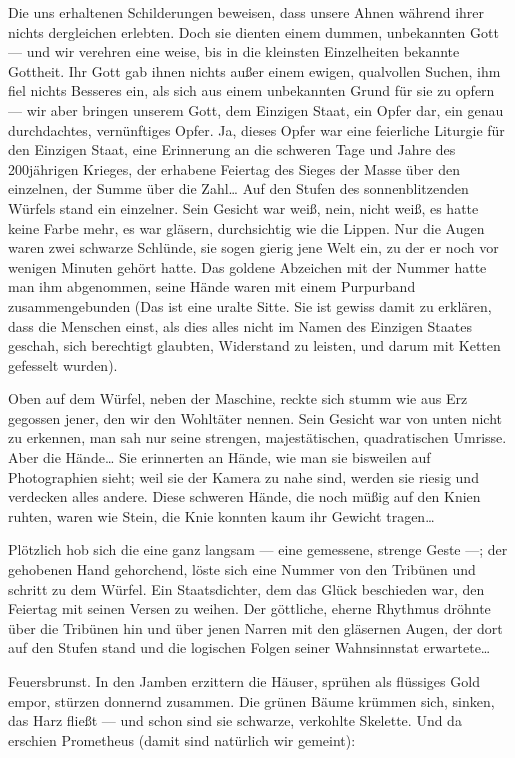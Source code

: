 Die uns erhaltenen Schilderungen beweisen, dass unsere Ahnen
während ihrer  nichts dergleichen erlebten. Doch sie
dienten einem dummen, unbekannten Gott — und wir verehren eine
weise, bis in die kleinsten Einzelheiten bekannte Gottheit. Ihr
Gott gab ihnen nichts außer einem ewigen, qualvollen Suchen, ihm
fiel nichts Besseres ein, als sich aus einem unbekannten Grund für
sie zu opfern — wir aber bringen unserem Gott, dem Einzigen Staat,
ein Opfer dar, ein genau durchdachtes, vernünftiges Opfer. Ja,
dieses Opfer war eine feierliche Liturgie für den Einzigen Staat,
eine Erinnerung an die schweren Tage und Jahre des 200jährigen
Krieges, der erhabene Feiertag des Sieges der Masse über den
einzelnen, der Summe über die Zahl\ldots{} Auf den Stufen des
sonnenblitzenden Würfels stand ein einzelner. Sein Gesicht war
weiß, nein, nicht weiß, es hatte keine Farbe mehr, es war gläsern,
durchsichtig wie die Lippen. Nur die Augen waren zwei schwarze
Schlünde, sie sogen gierig jene Welt ein, zu der er noch vor
wenigen Minuten gehört hatte. Das goldene Abzeichen mit der Nummer
hatte man ihm abgenommen, seine Hände waren mit einem Purpurband
zusammengebunden (Das ist eine uralte Sitte. Sie ist gewiss damit
zu erklären, dass die Menschen einst, als dies alles nicht im Namen
des Einzigen Staates geschah, sich berechtigt glaubten, Widerstand
zu leisten, und darum mit Ketten gefesselt wurden).

Oben auf dem Würfel, neben der Maschine, reckte sich stumm wie aus
Erz gegossen jener, den wir den Wohltäter nennen. Sein Gesicht war
von unten nicht zu erkennen, man sah nur seine strengen,
majestätischen, quadratischen Umrisse. Aber die Hände\ldots{} Sie
erinnerten an Hände, wie man sie bisweilen auf Photographien sieht;
weil sie der Kamera zu nahe sind, werden sie riesig und verdecken
alles andere. Diese schweren Hände, die noch müßig auf den Knien
ruhten, waren wie Stein, die Knie konnten kaum ihr Gewicht
tragen\ldots{}

Plötzlich hob sich die eine ganz langsam — eine
gemessene, strenge Geste —; der gehobenen Hand gehorchend, löste
sich eine Nummer von den Tribünen und schritt zu dem Würfel. Ein
Staatsdichter, dem das Glück beschieden war, den Feiertag mit
seinen Versen zu weihen. Der göttliche, eherne Rhythmus dröhnte
über die Tribünen hin und über jenen Narren mit den gläsernen
Augen, der dort auf den Stufen stand und die logischen Folgen
seiner Wahnsinnstat erwartete\ldots{}

Feuersbrunst. In den Jamben
erzittern die Häuser, sprühen als flüssiges Gold empor, stürzen
donnernd zusammen. Die grünen Bäume krümmen sich, sinken, das Harz
fließt — und schon sind sie schwarze, verkohlte Skelette. Und da
erschien Prometheus (damit sind natürlich wir gemeint):

